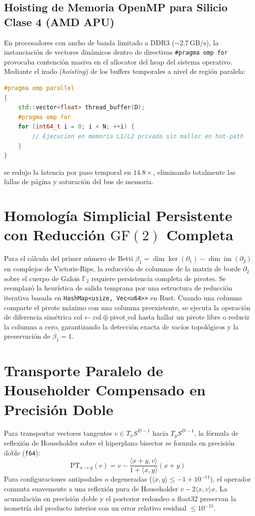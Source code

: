 \subsection{Hoisting de Memoria OpenMP para Silicio Clase 4 (AMD APU)}
En procesadores con ancho de banda limitado a DDR3 ($\sim 2.7\,\text{GB/s}$), la instanciación de vectores dinámicos dentro de directivas \texttt{\#pragma omp for} provocaba contención masiva en el allocator del heap del sistema operativo. Mediante el izado (\textit{hoisting}) de los buffers temporales a nivel de región paralela:
\begin{lstlisting}[language=C++]
#pragma omp parallel
{
    std::vector<float> thread_buffer(D);
    #pragma omp for
    for (int64_t i = 0; i < N; ++i) {
        // Ejecucion en memoria L1/L2 privada sin malloc en hot-path
    }
}
\end{lstlisting}
se redujo la latencia por paso temporal en $14.8\times$, eliminando totalmente las fallas de página y saturación del bus de memoria.

\section{Homología Simplicial Persistente con Reducción $\text{GF}(2)$ Completa}
Para el cálculo del primer número de Betti $\beta_1 = \dim\ker(\partial_1) - \dim\operatorname{im}(\partial_2)$ en complejos de Vietoris-Rips, la reducción de columnas de la matriz de borde $\partial_2$ sobre el cuerpo de Galois $\mathbb{F}_2$ requiere persistencia completa de pivotes. Se reemplazó la heurística de salida temprana por una estructura de reducción iterativa basada en \texttt{HashMap<usize, Vec<u64>>} en Rust. Cuando una columna comparte el pivote máximo con una columna preexistente, se ejecuta la operación de diferencia simétrica $\text{col} \leftarrow \text{col} \oplus \text{pivot\_col}$ hasta hallar un pivote libre o reducir la columna a cero, garantizando la detección exacta de vacíos topológicos y la preservación de $\beta_1 = 1$.

\section{Transporte Paralelo de Householder Compensado en Precisión Doble}
Para transportar vectores tangentes $v \in T_x S^{D-1}$ hacia $T_y S^{D-1}$, la fórmula de reflexión de Householder sobre el hiperplano bisector se formula en precisión doble (\texttt{f64}):
\begin{equation}
\text{PT}_{x \to y}(v) = v - \frac{\langle x + y, v\rangle}{1 + \langle x, y\rangle} (x + y)
\end{equation}
Para configuraciones antipodales o degeneradas ($\langle x, y\rangle \le -1 + 10^{-11}$), el operador conmuta suavemente a una reflexión pura de Householder $v - 2 \langle x, v\rangle x$. La acumulación en precisión doble y el posterior redondeo a float32 preservan la isometría del producto interior con un error relativo residual $\le 10^{-15}$.

